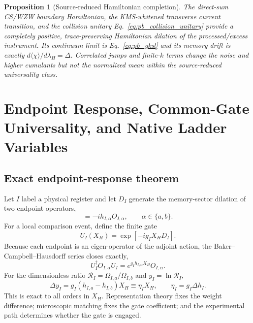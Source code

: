 \documentclass[aps,prd,twocolumn,10pt,superscriptaddress,nofootinbib]{revtex4-2}
\newtheorem{proposition}{Proposition}
\begin{document}
\begin{proposition}[Source-reduced Hamiltonian completion]
The direct-sum CS/WZW boundary Hamiltonian, the KMS-whitened transverse
current transition, and the collision unitary
Eq.~\eqref{eq:pb_collision_unitary} provide a completely positive,
trace-preserving Hamiltonian dilation of the processed/excess instrument.
Its continuum limit is Eq.~\eqref{eq:pb_gksl} and its memory drift is exactly
$d\langle\chi\rangle/d\lambda_H=\Delta$.  Correlated jumps and finite-$k$
terms change the noise and higher cumulants but not the normalized mean
within the source-reduced universality class.
\end{proposition}


\section{Endpoint Response, Common-Gate Universality, and Native Ladder Variables}
\label{sec:endpoint_theorem}

\subsection{Exact endpoint-response theorem}

Let $I$ label a physical register and let $D_I$ generate the memory-sector
dilation of two endpoint operators,
\begin{equation}
[D_I,O_{I,\alpha}]=-ih_{I,\alpha}O_{I,\alpha},
\qquad \alpha\in\{a,b\}.
\label{eq:pb_endpoint_weights}
\end{equation}
For a local comparison event, define the finite gate
\begin{equation}
U_I(X_H)=\exp[-ig_I X_HD_I].
\label{eq:pb_endpoint_gate}
\end{equation}
Because each endpoint is an eigen-operator of the adjoint action, the
Baker--Campbell--Hausdorff series closes exactly,
\begin{equation}
U_I^\dagger O_{I,\alpha}U_I
=e^{g_Ih_{I,\alpha}X_H}O_{I,\alpha}.
\label{eq:pb_endpoint_response}
\end{equation}
For the dimensionless ratio
$\mathcal R_I=\Omega_{I,a}/\Omega_{I,b}$ and
$y_I=\ln\mathcal R_I$,
\begin{equation}
\Delta y_I
=g_I(h_{I,a}-h_{I,b})X_H
\equiv\eta_I X_H,
\qquad
\eta_I=g_I\Delta h_I.
\label{eq:pb_eta_factorization}
\end{equation}
This is exact to all orders in $X_H$.  Representation theory fixes the
weight difference; microscopic matching fixes the gate coefficient; and the
experimental path determines whether the gate is engaged.
\end{document}
